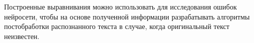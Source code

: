 \documentclass{main.tex}[subfiles]
\begin{document}
Построенные выравнивания можно использовать для исследования ошибок нейросети, чтобы на основе полученной информации разрабатывать алгоритмы постобработки распознанного текста в случае, когда оригинальный текст неизвестен.
\end{document}
